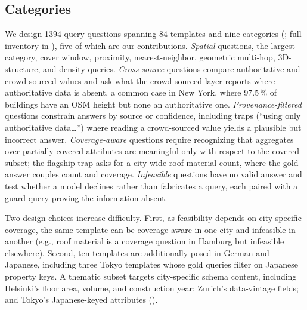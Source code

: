 \documentclass[sigconf,authordraft]{acmart}
\begin{document}
\subsection{Categories}

We design \num{1394} query questions spanning 84 templates and nine categories (; full inventory in ), five of which are our contributions. \emph{Spatial} questions, the largest category, cover window, proximity, nearest-neighbor, geometric multi-hop, 3D-structure, and density queries. \emph{Cross-source} questions compare authoritative and crowd-sourced values and ask what the crowd-sourced layer reports where authoritative data is absent, a common case in New York, where \num{97.5}\,\% of buildings have an OSM height but none an authoritative one. \emph{Provenance-filtered} questions constrain answers by source or confidence, including traps (``using only authoritative data\ldots'') where reading a crowd-sourced value yields a plausible but incorrect answer. \emph{Coverage-aware} questions require recognizing that aggregates over partially covered attributes are meaningful only with respect to the covered subset; the flagship trap asks for a city-wide roof-material count, where the gold answer couples count and coverage. \emph{Infeasible} questions have no valid answer and test whether a model declines rather than fabricates a query, each paired with a guard query proving the information absent. 

Two design choices increase difficulty. First, as feasibility depends on city-specific coverage, the same template can be coverage-aware in one city and infeasible in another (e.g., roof material is a coverage question in Hamburg but infeasible elsewhere). Second, ten templates are additionally posed in German and Japanese, including three Tokyo templates whose gold queries filter on Japanese property keys. A thematic subset targets city-specific schema content, including Helsinki's floor area, volume, and construction year; Zurich's data-vintage fields; and Tokyo's Japanese-keyed attributes 
().
\end{document}
